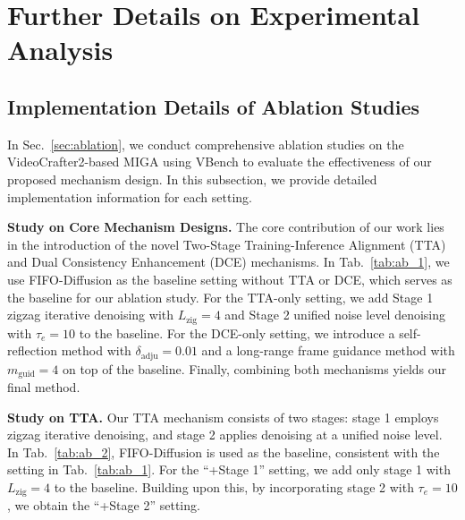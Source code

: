 \documentclass{llmxive}
\begin{document}
\section{Further Details on Experimental Analysis}
\subsection{Implementation Details of Ablation Studies}
\label{app:ab_exp_imp}
In Sec.~\ref{sec:ablation}, we conduct comprehensive ablation studies on the VideoCrafter2-based MIGA using VBench to evaluate the effectiveness of our proposed mechanism design.
In this subsection, we provide detailed implementation information for each setting.

\textbf{Study on Core Mechanism Designs.}
The core contribution of our work lies in the introduction of the novel Two-Stage Training-Inference Alignment (TTA) and Dual Consistency Enhancement (DCE) mechanisms.
In Tab.~\ref{tab:ab_1}, we use FIFO-Diffusion as the baseline setting without TTA or DCE, which serves as the baseline for our ablation study.
For the TTA-only setting, we add Stage 1 zigzag iterative denoising with $L_{\mathrm{zig}}=4$ and Stage 2 unified noise level denoising with $\tau_e = 10$ to the baseline.
For the DCE-only setting, we introduce a self-reflection method with $\delta_{\mathrm{adju}}=0.01$ and a long-range frame guidance \cite{chen2025s2guidancestochasticselfguidance,feng2025atctrack} method with $m_{\mathrm{guid}}=4$ on top of the baseline.
Finally, combining both mechanisms yields our final method.


\textbf{Study on TTA.}
Our TTA mechanism consists of two stages: stage 1 employs zigzag iterative denoising, and stage 2 applies denoising at a unified noise level.
In Tab.~\ref{tab:ab_2}, FIFO-Diffusion is used as the baseline, consistent with the setting in Tab.~\ref{tab:ab_1}.
For the “+Stage 1” setting, we add only stage 1 with $L_{\mathrm{zig}}=4$ to the baseline.
Building upon this, by incorporating stage 2 with $\tau_e=10$, we obtain the “+Stage 2” setting.
\end{document}
